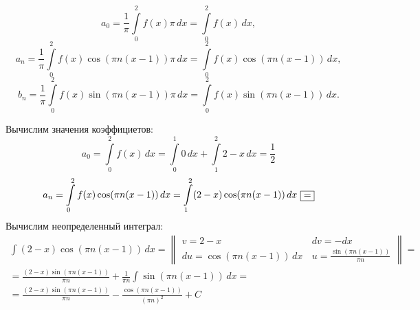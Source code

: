 \documentclass[a5paper, 10pt]{article}
\theoremstyle{definition}
\theoremstyle{plain}
\theoremstyle{remark}
\begin{document}
\begin{equation*}
a_0 = \frac{1}{\pi} \int \limits_{0}^{2} f(x) \pi \, dx = \int \limits_{0}^{2} f(x) \, dx, 
\end{equation*}
\begin{equation*}
a_n = \frac{1}{\pi} \int \limits_{0}^{2} f(x) \cos(\pi n(x-1))  \pi \, dx = \int \limits_{0}^{2} f(x) \cos(\pi n(x-1)) \, dx ,
\end{equation*}
\begin{equation*}
b_n = \frac{1}{\pi} \int \limits_{0}^{2} f(x) \sin(\pi n(x-1)) \pi \, dx = \int \limits_{0}^{2} f(x) \sin(\pi n(x-1)) \, dx .
\end{equation*}

Вычислим значения коэффициетов:
\begin{equation*}
a_0 = \int \limits_{0}^{2} f(x) \, dx = \int \limits_{0}^{1} 0 \, dx + \int \limits_{1}^{2} 2 - x \, dx = \frac{1}{2}
\end{equation*}
\begin{multline*}
a_n  = \int \limits_{0}^{2} f(x) \cos(\pi n(x-1)) \, dx = \int \limits_{1}^{2} (2-x) \cos(\pi n(x-1)) \, dx \, \, \fbox{=}
\end{multline*}
Вычислим неопределенный интеграл:
\begin{multline*}
 \int  (2-x) \cos(\pi n(x-1)) \, dx = 
\begin{Vmatrix}
v = 2-x \, & dv = -dx\\
du = \cos(\pi n(x-1)) \, dx \, & u = \frac{\sin(\pi n(x-1))}{\pi n}
\end{Vmatrix}
= \\ =  \frac{(2-x) \sin(\pi n(x-1))}{\pi n} + \frac{1}{\pi n} \int \sin(\pi n(x-1)) \, dx = \\=
 \frac{(2-x) \sin(\pi n(x-1))}{\pi n} -  \frac{\cos (\pi n(x-1))}{(\pi n)^2} + C
\end{multline*}
\end{document}
